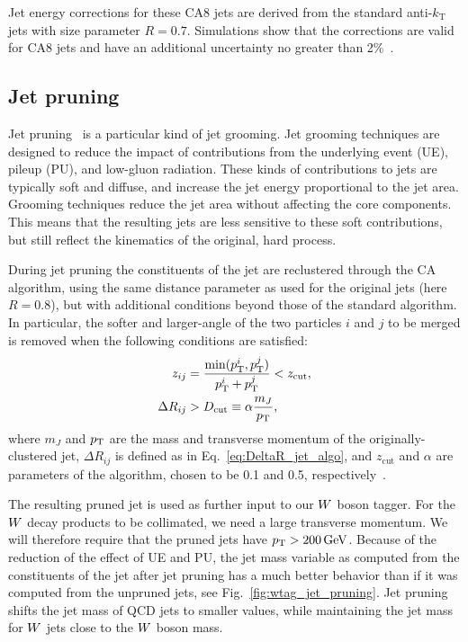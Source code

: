 Jet energy corrections for these CA8 jets are derived from the standard anti-$k_\textrm{T}$ jets
with size parameter $R=0.7$. Simulations show that the corrections are valid for CA8 jets and
have an additional uncertainty no greater than 2\%~\cite{CMS-PAS-JME-13-007}.  


\subsection{Jet pruning}

Jet pruning~\cite{Ellis:2009su,Ellis:2009me} is a particular kind of jet grooming. Jet grooming
techniques are designed to reduce the impact of contributions from the underlying event (UE), pileup
(PU), and low-\pt gluon radiation. These kinds of contributions to jets are typically soft and
diffuse, and increase the jet energy proportional to the jet area. Grooming techniques reduce the
jet area without affecting the core components. This means that the resulting jets are less
sensitive to these soft contributions, but still reflect the kinematics of the original, hard
process.


During jet pruning the constituents of the jet are reclustered through the CA algorithm, using the
same distance parameter as used for the original jets (here $R=0.8$), but with additional conditions
beyond those of the standard algorithm.
In particular, the softer and larger-angle of the two particles $i$ and $j$ to be merged is removed
when the following conditions are satisfied:
\begin{align}
  z_{ij} &= \frac{\min( p_{\mathrm{T}}^i , p_{\mathrm{T}}^j )}{p_{\mathrm{T}}^i + p_{\mathrm{T}}^j} < z_{\textrm{cut}}, \\
  \Delta R_{ij} &> D_{\textrm{cut}} \equiv \alpha \frac{m_J}{p_{\mathrm{T}}} ,
\end{align}
where $m_J$ and $p_{\mathrm{T}}$ are the mass and transverse momentum of the originally-clustered jet, $\Delta
R_{ij}$ is defined as in Eq.~\ref{eq:DeltaR_jet_algo}, and
$z_\textrm{cut}$ and $\alpha$ are parameters of the algorithm, chosen to be 0.1 and 0.5,
respectively~\cite{Chatrchyan:2013vbb}. 

The resulting pruned jet is used as further input to our $W$ boson tagger. For the $W$ decay
products to be collimated, we need a large transverse momentum. We will therefore require that the
pruned jets have $p_{\mathrm{T}} > 200\,\text{Ge\hspace{-.08em}V}$. 
Because of the reduction of the effect of UE and PU, the jet mass variable as computed from the
constituents of the jet after jet pruning has a much better behavior than if it was computed from
the unpruned jets, see Fig.~\ref{fig:wtag_jet_pruning}. Jet pruning shifts the jet mass of QCD jets
to smaller values, while maintaining the jet mass for $W$ jets close to the $W$ boson mass.

